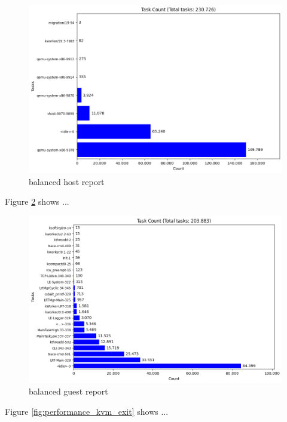 \documentclass[MMR,Master,english]{twbook}
\begin{document}
\begin{figure}[H]
	\centering
	\includegraphics[width=1.0\columnwidth]{img/balanced/results_host_report.png}
	\caption[balanced host report]{balanced host report}
	\label{fig:balanced_kvm_host}
\end{figure}
\clearpage

Figure \ref{fig:balanced_kvm_guest} shows ...

\begin{figure}[H]
	\centering
	\includegraphics[width=1.0\columnwidth]{img/balanced/results_guest_report.png}
	\caption[balanced guest report]{balanced guest report}
	\label{fig:balanced_kvm_guest}
\end{figure}
\clearpage



Figure \ref{fig:performance_kvm_exit} shows ...
\end{document}

